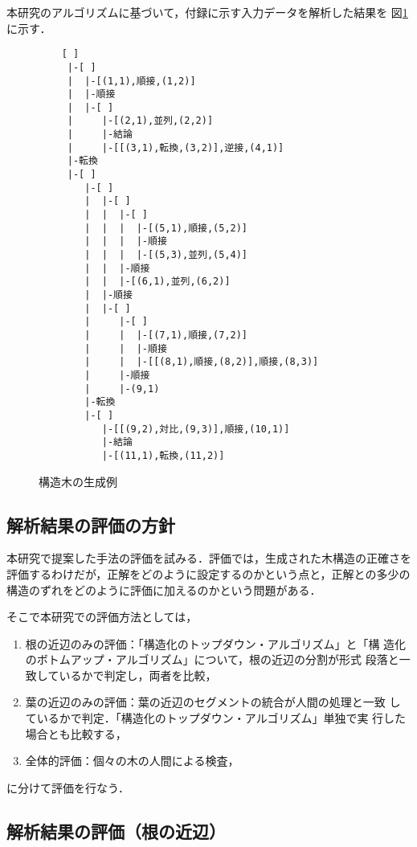 本研究のアルゴリズムに基づいて，付録に示す入力データを解析した結果を
図\ref{tree_example}に示す．
\begin{figure}[htbp]
\baselineskip=12pt
\begin{verbatim}
    [ ]
     |-[ ]
     |  |-[(1,1),順接,(1,2)]
     |  |-順接
     |  |-[ ]
     |     |-[(2,1),並列,(2,2)]
     |     |-結論
     |     |-[[(3,1),転換,(3,2)],逆接,(4,1)]
     |-転換
     |-[ ]
        |-[ ]
        |  |-[ ]
        |  |  |-[ ]
        |  |  |  |-[(5,1),順接,(5,2)]
        |  |  |  |-順接
        |  |  |  |-[(5,3),並列,(5,4)]
        |  |  |-順接
        |  |  |-[(6,1),並列,(6,2)]
        |  |-順接
        |  |-[ ]
        |     |-[ ]
        |     |  |-[(7,1),順接,(7,2)]
        |     |  |-順接
        |     |  |-[[(8,1),順接,(8,2)],順接,(8,3)]
        |     |-順接
        |     |-(9,1)
        |-転換
        |-[ ]
           |-[[(9,2),対比,(9,3)],順接,(10,1)]
           |-結論
           |-[(11,1),転換,(11,2)]
\end{verbatim}
\caption{構造木の生成例}\label{tree_example}
\end{figure}


\subsection{解析結果の評価の方針}

本研究で提案した手法の評価を試みる．評価では，生成された木構造の正確さを
評価するわけだが，正解をどのように設定するのかという点と，正解との多少の
構造のずれをどのように評価に加えるのかという問題がある．

そこで本研究での評価方法としては，
\begin{enumerate}
 \item 根の近辺のみの評価：「構造化のトップダウン・アルゴリズム」と「構
       造化のボトムアップ・アルゴリズム」について，根の近辺の分割が形式
       段落と一致しているかで判定し，両者を比較，
 \item 葉の近辺のみの評価：葉の近辺のセグメントの統合が人間の処理と一致
       しているかで判定．「構造化のトップダウン・アルゴリズム」単独で実
       行した場合とも比較する，
 \item 全体的評価：個々の木の人間による検査，
\end{enumerate}
に分けて評価を行なう．

\subsection{解析結果の評価（根の近辺）}

